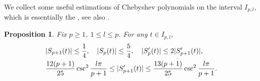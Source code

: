 \documentclass[reqno,11pt,graphicx,]{amsart}
\numberwithin{equation}{section}
\theoremstyle{plain}
\newcommand{\3}{\mathbf{3}}
\newtheorem{proposition}[theorem]{Proposition}
\begin{document}
	We collect some useful estimations of Chebyshev polynomials on the interval $I_{p,l}$,
	which is essentially the  \cite[Proposition 7]{LW2004}, see also \cite[Proposition 3.2]{FLW2011}.
	\begin{proposition}\label{keyLW}
		Fix $p\ge1$, $1\le l\le p$. For any $t\in I_{p,l}$,
		\begin{align}\label{new-est}
			&	|S_{p+1}(t)|\le\frac{1}{4},\quad |S_p(t)|\le \frac{5}{4},\quad |S'_p(t)|\le2|S'_{p+1}(t)|,\notag\\
			&		\frac{12(p+1)}{25}\csc^2\frac{l\pi}{p+1}
			\le |S'_{p+1}(t)|\le \frac{13(p+1)}{25}\csc^2\frac{l\pi}{p+1}.
		\end{align}
	\end{proposition}
\end{document}

